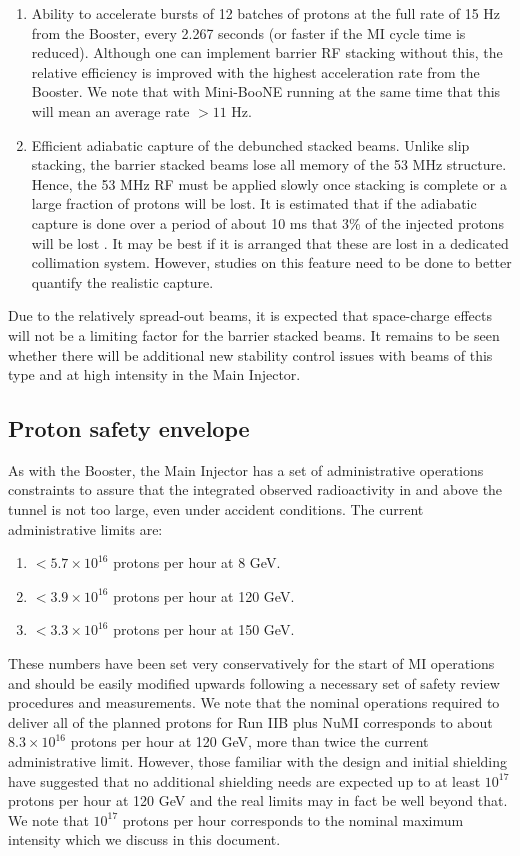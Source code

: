 \documentclass{article}
\begin{document}
\begin {enumerate}
      period of about two years at a cost between \$1-3M.      
\item Ability to accelerate bursts of 12 batches of protons at the full
      rate of 15 Hz from the Booster, every 2.267 seconds (or faster if the
      MI cycle time is reduced). Although one can implement barrier RF
      stacking without this, the relative efficiency is improved with the
      highest acceleration rate from the Booster. We note that with Mini-BooNE
      running at the same time that this will mean an average rate $>11$ Hz.
\item Efficient adiabatic capture of the debunched stacked beams. Unlike
      slip stacking, the barrier stacked beams lose all memory of the 53 MHz
      structure. Hence, the 53 MHz RF must be applied slowly once stacking
      is complete or a large fraction of protons will be lost. It is 
      estimated that if the adiabatic capture is done over a period of about
      10 ms that 3\% of the injected protons will be lost \cite {Ng}. 
      It may be best
      if it is arranged that these are lost in a dedicated collimation system.
      However, studies on this feature need to be done to better quantify
      the realistic capture.
\end {enumerate}
Due to the relatively spread-out beams, it is expected that space-charge
effects will not be a limiting factor for the barrier
stacked beams. It remains to
be seen whether there will be additional new stability control issues with
beams of this type and at high intensity in the Main Injector.

\subsection {Proton safety envelope}

   As with the Booster, the Main Injector has a set of administrative 
operations constraints to assure that the integrated observed radioactivity 
in and above the tunnel is not too large, even under accident conditions. 
The current administrative limits
are:
\begin {enumerate}
\item $<5.7\times10^{16}$ protons per hour at 8 GeV.
\item $<3.9\times10^{16}$ protons per hour at 120 GeV.
\item $<3.3\times10^{16}$ protons per hour at 150 GeV.
\end {enumerate}
These numbers have been set very conservatively for the start of MI operations
and should be easily modified upwards following a necessary set of safety
review procedures and measurements. We note that the nominal operations
required to deliver all of the planned protons for Run IIB plus NuMI 
corresponds to about $8.3\times10^{16}$ protons per hour at 120 GeV, more
than twice the current administrative limit. However, those familiar with
the design and initial shielding have suggested that no additional shielding
needs are expected up to at least $10^{17}$ protons per hour at 120 GeV and
the real limits may in fact be well beyond that. We note that $10^{17}$
protons per hour corresponds to the nominal maximum intensity which we
discuss in this document.
\end{document}
